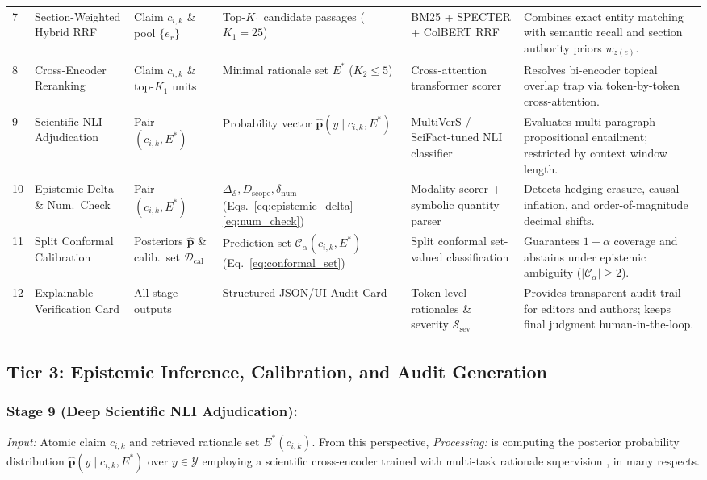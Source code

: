 \documentclass[journal]{IEEEtran}
\begin{document}
\begin{table}[t]
\begin{tabularx}{\textwidth}{C{0.5cm} L{2.5cm} L{2.3cm} L{2.4cm} L{3.2cm} Y}
7 & Section-Weighted Hybrid RRF & Claim $c_{i,k}$ \& pool $\{e_r\}$ & Top-$K_1$ candidate passages ($K_1=25$) & BM25 \cite{robertson2009probabilistic} + SPECTER \cite{cohan2020specter} + ColBERT \cite{khattab2020colbert} RRF \cite{cormack2009reciprocal} & Combines exact entity matching with semantic recall and section authority priors $w_{z(e)}$. \\
8 & Cross-Encoder Reranking & Claim $c_{i,k}$ \& top-$K_1$ units & Minimal rationale set $E^*$ ($K_2 \leq 5$) & Cross-attention transformer scorer \cite{wadden2022multivers} & Resolves bi-encoder topical overlap trap via token-by-token cross-attention. \\
9 & Scientific NLI Adjudication & Pair $(c_{i,k}, E^*)$ & Probability vector $\hat{\mathbf{p}}(y \mid c_{i,k}, E^*)$ & MultiVerS / SciFact-tuned NLI classifier \cite{wadden2020fact,wadden2022multivers} & Evaluates multi-paragraph propositional entailment; restricted by context window length. \\
10 & Epistemic Delta \& Num.\ Check & Pair $(c_{i,k}, E^*)$ & $\Delta_{\mathcal{E}}, D_{\text{scope}}, \delta_{\text{num}}$ (Eqs.~\ref{eq:epistemic_delta}--\ref{eq:num_check}) & Modality scorer \cite{hyland1998hedging} + symbolic quantity parser \cite{lu2023scitab} & Detects hedging erasure, causal inflation, and order-of-magnitude decimal shifts. \\
11 & Split Conformal Calibration & Posteriors $\hat{\mathbf{p}}$ \& calib.\ set $\mathcal{D}_{\text{cal}}$ & Prediction set $\mathcal{C}_{\alpha}(c_{i,k}, E^*)$ (Eq.~\ref{eq:conformal_set}) & Split conformal set-valued classification \cite{sadinle2019least,angelopoulos2023conformal} & Guarantees $1-\alpha$ coverage and abstains under epistemic ambiguity ($|\mathcal{C}_{\alpha}| \geq 2$). \\
12 & Explainable Verification Card & All stage outputs & Structured JSON/UI Audit Card & Token-level rationales \cite{rashkin2023measuring,gao2023enabling} \& severity $\mathcal{S}_{\text{sev}}$ & Provides transparent audit trail for editors and authors; keeps final judgment human-in-the-loop. \\
\bottomrule
\end{tabularx}
\end{table}

\subsection{Tier 3: Epistemic Inference, Calibration, and Audit Generation}
\subsubsection{Stage 9 (Deep Scientific NLI Adjudication):}
\emph{Input:} Atomic claim $c_{i,k}$ and retrieved rationale set $E^*(c_{i,k})$. From this perspective, \emph{Processing:} is computing the posterior probability distribution $\hat{\mathbf{p}}(y \mid c_{i,k}, E^*)$ over $y \in \mathcal{Y}$ employing a scientific cross-encoder trained with multi-task rationale supervision \cite{wadden2020fact,wadden2022multivers}, in many respects.
\end{document}
